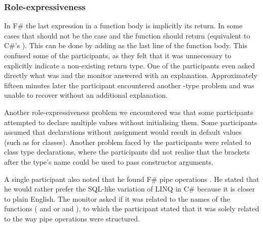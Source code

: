 \subsubsection{Role-expressiveness}
In F\# the last expression in a function body is implicitly its return. In some cases that should not be the case and the function should return  (equivalent to C\#'s ). This can be done by adding \ttt{()} as the last line of the function body. This confused some of the participants, as they felt that it was unnecessary to explicitly indicate a non-existing return type. One of the participants even asked directly what  was and the monitor answered with an explanation. Approximately fifteen minutes later the participant encountered another -type problem and was unable to recover without an additional explanation.

Another role-expressiveness problem we encountered was that some participants attempted to  declare multiple values without initialising them. Some participants assumed that  declarations without assignment would result in default values (such as  for classes). Another problem faced by the participants were related to class type declarations, where the participants did not realise that the brackets after the type's name could be used to pass constructor arguments.

A single participant also noted that he found F\# pipe operations \textit{}. He stated that he would rather prefer the SQL-like variation of \gls{LINQ} in C\# because it is closer to plain English. The monitor asked if it was related to the names of the functions ( and  or  and ), to which the participant stated that it was solely related to the way pipe operations were structured.
